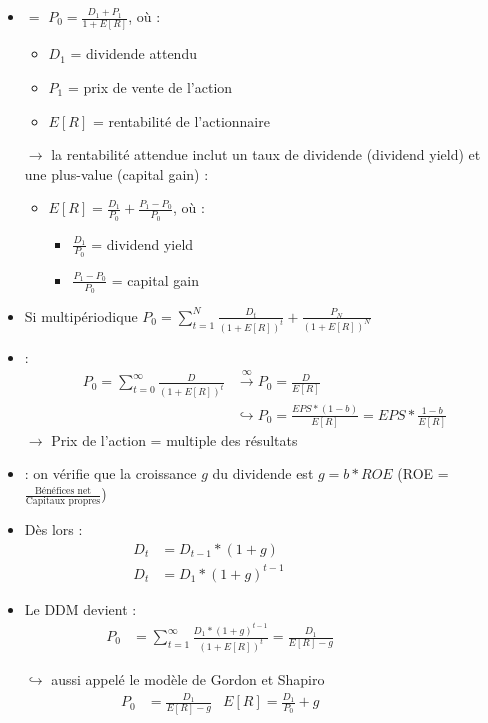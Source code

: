 \begin{itemize}
    \item {} $=$ $P_0 = \frac{D_1 + P_1}{1 + E[R]}$, où :
    \begin{itemize}
        \item $D_1$ = dividende attendu
        \item $P_1$ = prix de vente de l'action
        \item $E[R]$ = rentabilité de l'actionnaire
    \end{itemize}
    \item[$\rightarrow$] la rentabilité attendue inclut un taux de dividende (dividend yield) et une plus-value (capital gain) :
    \begin{itemize}
        \item $E[R] = \frac{D_1}{P_0} + \frac{P_1 - P_0}{P_0}$, où :
        \begin{itemize}
            \item $\frac{D_1}{P_0}$ = dividend yield
            \item $\frac{P_1 - P_0}{P_0}$ = capital gain
        \end{itemize}
    \end{itemize}
    \item Si multipériodique $P_0 = \sum_{t=1}^N \frac{D_t}{(1 + E[R])^t} + \frac{P_N}{(1 + E[R])^N}$
    \item {} :
    \begin{align*}
       P_0 = \sum_{t=0}^{\infty} \frac{D}{(1 + E[R])^t} &\xrightarrow{\infty} P_0 = \frac{D}{E[R]} \\
         &\hookrightarrow P_0 = \frac{EPS * (1-b)}{E[R]} = EPS * \frac{1-b}{E[R]}
    \end{align*}
    $\rightarrow$ Prix de l'action = multiple des résultats
    \item {} : on vérifie que la croissance $g$ du dividende est $g = b * ROE$ (ROE = $\frac{\text{Bénéfices net}}{\text{Capitaux propres}}$)
    \item Dès lors :
    \begin{align*}
        D_t &= D_{t-1} * (1 + g) &&&&&&&&&&\\
        D_t &= D_1 * (1+g)^{t-1} &&&&&&&&&&
    \end{align*}
    \item Le DDM devient :
    \begin{align*}
        P_0 &= \sum^{\infty}_{t=1} \frac{D_1 * (1+g)^{t-1}}{(1+E[R])^t} = \frac{D_1}{E[R] - g} &&&&&&&&
    \end{align*}
    \item[$\hookrightarrow$] aussi appelé le modèle de Gordon et Shapiro
    \begin{align*}
        P_0 &= \frac{D_1}{E[R] - g} & E[R] = \frac{D_1}{P_0} + g &&&&&&&&
    \end{align*}
\end{itemize}

